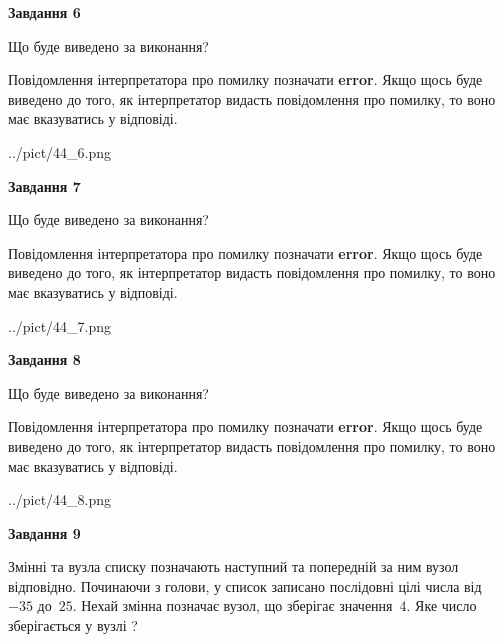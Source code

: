 \documentclass[12pt, ukrainian]{article}
\begin{document}
{\begin {large}
{\begin {center}\textbf{Завдання 6}\end {center}}\par
Що буде виведено за виконання?

Повідомлення інтерпретатора про помилку позначати \textbf{error}.
Якщо щось буде виведено до того, як інтерпретатор видасть повідомлення про помилку, 
то воно має вказуватись у відповіді. \par


\begin{center}
	{../pict/44_6.png}
\end{center}
\newpage

{\begin {center}\textbf{Завдання 7}\end {center}}\par
Що буде виведено за виконання?

Повідомлення інтерпретатора про помилку позначати \textbf{error}.
Якщо щось буде виведено до того, як інтерпретатор видасть повідомлення про помилку, 
то воно має вказуватись у відповіді. \par


\begin{center}
	{../pict/44_7.png}
\end{center}
\newpage

{\begin {center}\textbf{Завдання 8}\end {center}}\par
Що буде виведено за виконання?

Повідомлення інтерпретатора про помилку позначати \textbf{error}.
Якщо щось буде виведено до того, як інтерпретатор видасть повідомлення про помилку, 
то воно має вказуватись у відповіді. \par


\begin{center}
	{../pict/44_8.png}
\end{center}
\newpage

{\begin {center}\textbf{Завдання 9}\end {center}}\par
Змінні  та  вузла списку позначають наступний та попередній за ним вузол відповідно. Починаючи з голови, у список записано послідовні цілі числа від~$-35$ до~$25$. Нехай змінна  позначає вузол, що зберігає значення~$4$.
Яке число зберігається у вузлі  ?\par
\newpage


\end{large}}
\end{document}
